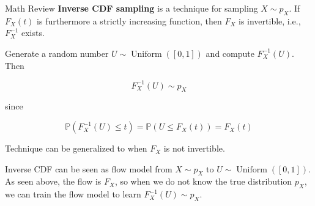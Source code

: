 \begin{frame}[allowframebreaks]

\begin{myconceptblock}{10.12}{Math Review}
    \textbf{Inverse CDF sampling} is a technique for sampling $X \sim p_{X}$.
    If $F_{X}(t)$ is furthermore a strictly increasing function, then $F_{X}$ is invertible, i.e., $F_{X}^{-1}$ exists.

    Generate a random number $U \sim \operatorname{Uniform}([0,1])$ and compute $F_{X}^{-1}(U)$. Then

    $$
    F_{X}^{-1}(U) \sim p_{X}
    $$

    since

    $$
    \mathbb{P}\left(F_{X}^{-1}(U) \leq t\right)=\mathbb{P}\left(U \leq F_{X}(t)\right)=F_{X}(t)
    $$

    Technique can be generalized to when $F_{X}$ is not invertible.

    \par\noindent\textcolor{gray}{\hdashrule{\textwidth}{0.4pt}{1pt 2pt}}

    Inverse CDF can be seen as flow model from $X \sim p_X$ to $U \sim \operatorname{Uniform}([0,1])$.
    As seen above, the flow is $F_X$, so when we do not know the true distribution $p_X$, we can train the flow model to learn $F_{X}^{-1}(U) \sim p_{X}$.
\end{myconceptblock}

\end{frame}

